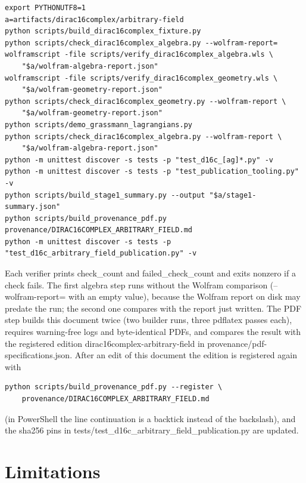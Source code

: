 \documentclass[11pt]{article}
\begin{document}
\begin{Verbatim}[fontsize=\small]
export PYTHONUTF8=1
a=artifacts/dirac16complex/arbitrary-field
python scripts/build_dirac16complex_fixture.py
python scripts/check_dirac16complex_algebra.py --wolfram-report=
wolframscript -file scripts/verify_dirac16complex_algebra.wls \
    "$a/wolfram-algebra-report.json"
wolframscript -file scripts/verify_dirac16complex_geometry.wls \
    "$a/wolfram-geometry-report.json"
python scripts/check_dirac16complex_geometry.py --wolfram-report \
    "$a/wolfram-geometry-report.json"
python scripts/demo_grassmann_lagrangians.py
python scripts/check_dirac16complex_algebra.py --wolfram-report \
    "$a/wolfram-algebra-report.json"
python -m unittest discover -s tests -p "test_d16c_[ag]*.py" -v
python -m unittest discover -s tests -p "test_publication_tooling.py" -v
python scripts/build_stage1_summary.py --output "$a/stage1-summary.json"
python scripts/build_provenance_pdf.py provenance/DIRAC16COMPLEX_ARBITRARY_FIELD.md
python -m unittest discover -s tests -p "test_d16c_arbitrary_field_publication.py" -v
\end{Verbatim}

Each verifier prints check\_count and failed\_check\_count and exits nonzero if a check fails. The first algebra step runs without the Wolfram comparison (--wolfram-report= with an empty value), because the Wolfram report on disk may predate the run; the second one compares with the report just written. The PDF step builds this document twice (two builder runs, three pdflatex passes each), requires warning-free logs and byte-identical PDFs, and compares the result with the registered edition dirac16complex-arbitrary-field in provenance/pdf-specifications.json. After an edit of this document the edition is registered again with

\begin{Verbatim}[fontsize=\small]
python scripts/build_provenance_pdf.py --register \
    provenance/DIRAC16COMPLEX_ARBITRARY_FIELD.md
\end{Verbatim}

(in PowerShell the line continuation is a backtick instead of the backslash), and the sha256 pins in tests/test\_d16c\_arbitrary\_field\_publication.py are updated.

\section{Limitations}
\end{document}
